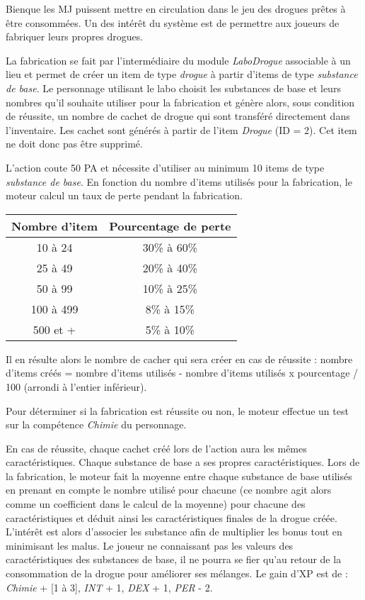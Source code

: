 Bienque les MJ puissent mettre en circulation dans le jeu des drogues prêtes à être consommées. Un des intérêt du système est de permettre aux joueurs de fabriquer leurs propres drogues.

La fabrication se fait par l'intermédiaire du module \emph{LaboDrogue} associable à un lieu et permet de créer un item de type \emph{drogue} à partir d'items de type \emph{substance de base}. Le personnage utilisant le labo choisit les substances de base et leurs nombres qu'il souhaite utiliser pour la fabrication et génère alors, sous condition de réussite, un nombre de cachet de drogue qui sont transféré directement dans l'inventaire. Les cachet sont générés à partir de l'item \emph{Drogue} (ID = 2). Cet item ne doit donc pas être supprimé.

L'action coute 50 PA et nécessite d'utiliser au minimum 10 items de type \emph{substance de base}. En fonction du nombre d'items utilisés pour la fabrication, le moteur calcul un taux de perte pendant la fabrication. 

\bigskip

\begin{tabular}{|c|c|}
	\hline
	Nombre d'item & Pourcentage de perte \\
	\hline
	10 à 24 & 30\% à 60\% \\
	25 à 49 & 20\% à 40\% \\
	50 à 99 & 10\% à 25\% \\
	100 à 499 & 8\% à 15\% \\
	500 et + & 5\% à 10\% \\
	\hline
\end{tabular}

\bigskip

Il en résulte alors le nombre de cacher qui sera créer en cas de réussite : nombre d'items créés = nombre d'items utilisés - nombre d'items utilisés x pourcentage / 100 (arrondi à l'entier inférieur).

Pour déterminer si la fabrication est réussite ou non, le moteur effectue un test sur la compétence \emph{Chimie} du personnage.

En cas de réussite, chaque cachet créé lors de l'action aura les mêmes caractéristiques. Chaque substance de base a ses propres caractéristiques. Lors de la fabrication, le moteur fait la moyenne entre chaque substance de base utilisés en prenant en compte le nombre utilisé pour chacune (ce nombre agit alors comme un coefficient dans le calcul de la moyenne) pour chacune des caractéristiques et déduit ainsi les caractéristiques finales de la drogue créée. L'intérêt est alors d'associer les substance afin de multiplier les bonus tout en minimisant les malus. Le joueur ne connaissant pas les valeurs des caractéristiques des substances de base, il ne pourra se fier qu'au retour de la consommation de la drogue pour améliorer ses mélanges. Le gain d'XP est de : \emph{Chimie} + [1 à 3], \emph{INT} + 1, \emph{DEX} + 1, \emph{PER} - 2.

